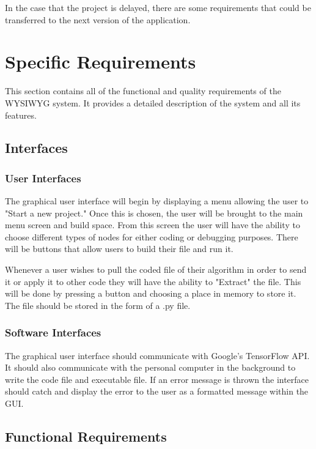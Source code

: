 \documentclass[journal,10pt,onecolumn,compsoc]{IEEEtran} \usepackage[margin=1.0in]{geometry} \usepackage{pdfpages} \usepackage{graphicx}
\begin{document}
In the case that the project is delayed, there are some requirements that could be transferred to the next version of the application. 

\newpage

\section{Specific Requirements}

This section contains all of the functional and quality requirements of the WYSIWYG system. 
It provides a detailed description of the system and all its features.


\subsection{Interfaces}
\subsubsection{User Interfaces}

The graphical user interface will begin by displaying a menu allowing the user to "Start a new project."
Once this is chosen, the user will be brought to the main menu screen and build space.
From this screen the user will have the ability to choose different types of nodes for either coding or debugging purposes.
There will be buttons that allow users to build their file and run it.

Whenever a user wishes to pull the coded file of their algorithm in order to send it or apply it to other code they will have the ability to "Extract" the file.
This will be done by pressing a button and choosing a place in memory to store it. 
The file should be stored in the form of a .py file.

\subsubsection{Software Interfaces}

The graphical user interface should communicate with Google's TensorFlow API.
It should also communicate with the personal computer in the background to write the code file and executable file.
If an error message is thrown the interface should catch and display the error to the user as a formatted message within the GUI.

\subsection{Functional Requirements}
\end{document}

